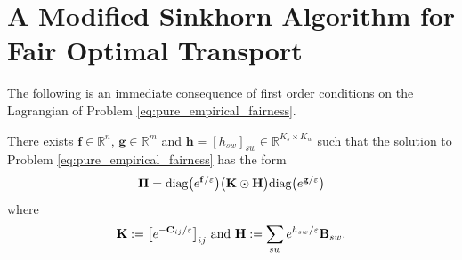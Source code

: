 \documentclass{article}
\theoremstyle{definition}
\begin{document}
\section{A Modified Sinkhorn Algorithm for Fair Optimal Transport}
\label{section:fair_sinkhorn}
The following is an immediate consequence of first order conditions on the Lagrangian of Problem \ref{eq:pure_empirical_fairness}.
\begin{boxprop}
    There exists $\mathbf{f} \in \mathbb{R}^{n}$, $\mathbf{g} \in \mathbb{R}^{m}$ and $\mathbf{h} = [h_{sw}]_{sw} \in \mathbb{R}^{K_s \times K_w}$ such that the solution to Problem \ref{eq:pure_empirical_fairness} has the form \begin{align*}
            \mathbf{\Pi} = \textnormal{diag}\big(e^{\mathbf{f}/\varepsilon}\big) \big(\mathbf{K} \odot \mathbf{H}\big)\textnormal{diag}\big(e^{\mathbf{g}/\varepsilon}\big)
        \end{align*}
        where 
        \begin{align*}
            \mathbf{K} := \big[e^{-\mathbf{C}_{ij}/\varepsilon}\big]_{ij} \textnormal{ and } \mathbf{H} := \sum_{sw}e^{h_{sw}/\varepsilon}\mathbf{B}_{sw}.
        \end{align*}
\end{boxprop}
\end{document}
